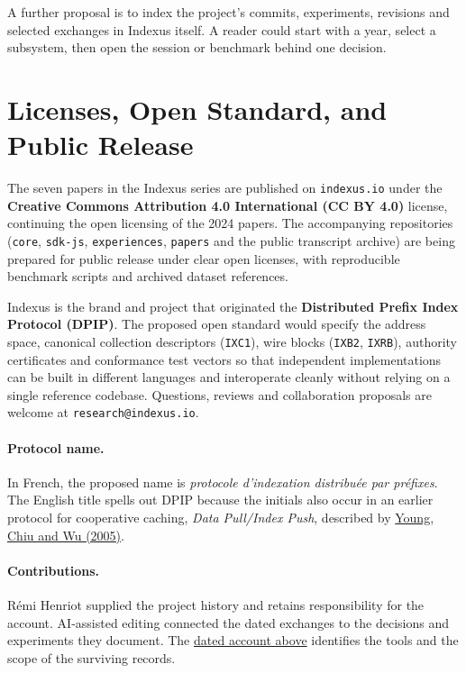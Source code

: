 \documentclass[11pt]{article}
\begin{document}
A further proposal is to index the project's commits, experiments, revisions and selected exchanges in Indexus itself. A reader could start with a year, select a subsystem, then open the session or benchmark behind one decision.

\section{Licenses, Open Standard, and Public Release}
The seven papers in the Indexus series are published on \texttt{indexus.io} under the \textbf{Creative Commons Attribution 4.0 International (CC BY 4.0)} license, continuing the open licensing of the 2024 papers. The accompanying repositories (\texttt{core}, \texttt{sdk-js}, \texttt{experiences}, \texttt{papers} and the public transcript archive) are being prepared for public release under clear open licenses, with reproducible benchmark scripts and archived dataset references.

Indexus is the brand and project that originated the \textbf{Distributed Prefix Index Protocol (DPIP)}. The proposed open standard would specify the address space, canonical collection descriptors (\texttt{IXC1}), wire blocks (\texttt{IXB2}, \texttt{IXRB}), authority certificates and conformance test vectors so that independent implementations can be built in different languages and interoperate cleanly without relying on a single reference codebase. Questions, reviews and collaboration proposals are welcome at \texttt{research@indexus.io}.

\paragraph{Protocol name.} In French, the proposed name is \emph{protocole d'indexation distribuée par préfixes}. The English title spells out DPIP because the initials also occur in an earlier protocol for cooperative caching, \emph{Data Pull/Index Push}, described by \href{https://dl.ifip.org/db/conf/euc/euc2005/YoungCW05.pdf}{Young, Chiu and Wu (2005)}.

\paragraph{Contributions.} Rémi Henriot supplied the project history and retains responsibility for the account. AI-assisted editing connected the dated exchanges to the decisions and experiments they document. The \hyperlink{ix:ai}{dated account above} identifies the tools and the scope of the surviving records.
\end{document}

